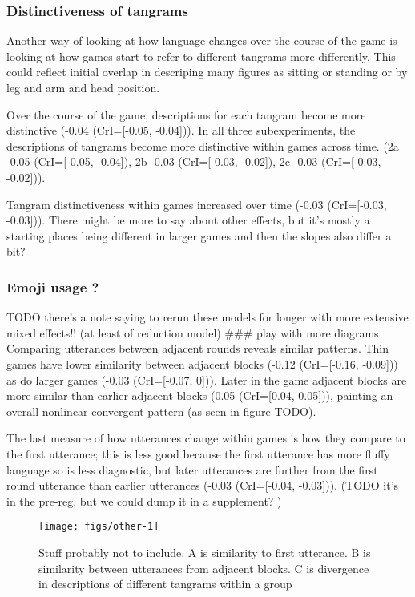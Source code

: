 \documentclass[
  english,
  a4paper,
]{article}
\begin{document}
\hypertarget{distinctiveness-of-tangrams}{%
\subsubsection{Distinctiveness of tangrams}\label{distinctiveness-of-tangrams}}

Another way of looking at how language changes over the course of the game is looking at how games start to refer to different tangrams more differently. This could reflect initial overlap in descriping many figures as sitting or standing or by leg and arm and head position.

Over the course of the game, descriptions for each tangram become more distinctive (-0.04 (CrI={[}-0.05, -0.04{]})).
In all three subexperiments, the descriptions of tangrams become more distinctive within games across time. (2a -0.05 (CrI={[}-0.05, -0.04{]}), 2b -0.03 (CrI={[}-0.03, -0.02{]}), 2c -0.03 (CrI={[}-0.03, -0.02{]})).

Tangram distinctiveness within games increased over time (-0.03 (CrI={[}-0.03, -0.03{]})). There might be more to say about other effects, but it's mostly a starting places being different in larger games and then the slopes also differ a bit?

\hypertarget{emoji-usage}{%
\subsubsection{Emoji usage ?}\label{emoji-usage}}

TODO there's a note saying to rerun these models for longer with more extensive mixed effects!! (at least of reduction model)
\#\#\# play with more diagrams
Comparing utterances between adjacent rounds reveals similar patterns. Thin games have lower similarity between adjacent blocks (-0.12 (CrI={[}-0.16, -0.09{]})) as do larger games (-0.03 (CrI={[}-0.07, 0{]})). Later in the game adjacent blocks are more similar than earlier adjacent blocks (0.05 (CrI={[}0.04, 0.05{]})), painting an overall nonlinear convergent pattern (as seen in figure TODO).

The last measure of how utterances change within games is how they compare to the first utterance; this is less good because the first utterance has more fluffy language so is less diagnostic, but later utterances are further from the first round utterance than earlier utterances (-0.03 (CrI={[}-0.04, -0.03{]})). (TODO it's in the pre-reg, but we could dump it in a supplement? )

\begin{figure*}[t!]

{\centering \texttt{[image: figs/other-1]} 

}

\caption{Stuff probably not to include. A is similarity to first utterance. B is similarity between utterances from adjacent blocks. C is divergence in descriptions of different tangrams within a group}\label{fig:other}
\end{figure*}
\end{document}
